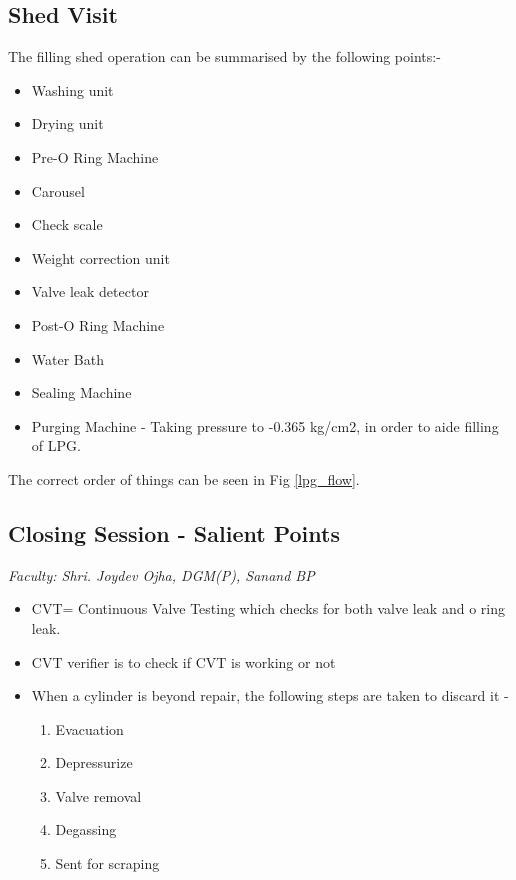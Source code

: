 \documentclass{report}
\begin{document}
	\subsection{Shed Visit}
	The filling shed operation can be summarised by the following points:-
	\begin{itemize}
		\item Washing unit
		\item Drying unit
		\item Pre-O Ring Machine
		\item Carousel
		\item Check scale
		\item Weight correction unit
		\item Valve leak detector
		\item Post-O Ring Machine
		\item Water Bath
		\item Sealing Machine
		\item Purging Machine - Taking pressure to -0.365 kg/cm2, in order to aide filling of LPG.
	\end{itemize}
	The correct order of things can be seen in Fig \ref{lpg_flow}.
	\subsection{Closing Session - Salient Points}
	\textit{Faculty: Shri. Joydev Ojha, DGM(P), Sanand BP}\\
	\begin{itemize}
	\item CVT= Continuous Valve Testing which checks for both valve leak and o ring leak.
	\item CVT verifier is to check if CVT is working or not
	\item When a cylinder is beyond repair, the following steps are taken to discard it - 
	\begin{enumerate}
		\item Evacuation
		\item Depressurize
		\item Valve removal
		\item Degassing
		\item Sent for scraping
	\end{enumerate}
	\end{itemize}
	
	\clearpage
	\pagebreak
\end{document}
